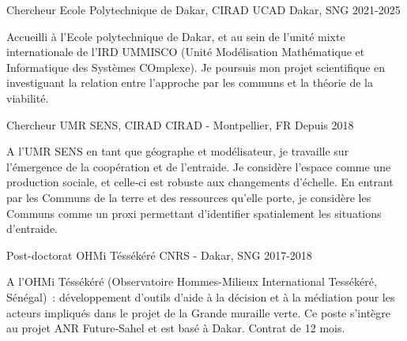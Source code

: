 

\begin{cventries}

\cventry
  {Chercheur} %
  {Ecole Polytechnique de Dakar, CIRAD} %
  {UCAD Dakar, SNG} %
  {2021-2025} %
  {
    \begin{cvitems} %
      Accueilli à l'Ecole polytechnique de Dakar, et au sein de l'unité mixte internationale de l'IRD UMMISCO (Unité Modélisation Mathématique et Informatique des Systèmes COmplexe). Je poursuis mon projet scientifique en investiguant la relation entre l'approche par les communs et la théorie de la viabilité.
    \end{cvitems}
  }


  \cventry
    {Chercheur} %
    {UMR SENS, CIRAD} %
    {CIRAD - Montpellier, FR} %
    {Depuis 2018} %
    {
      \begin{cvitems} %
        A l'UMR SENS en tant que géographe et modélisateur, je travaille sur l’émergence de la coopération et de l’entraide. Je considère l’espace comme une production sociale, et celle‑ci est robuste aux changements d’échelle. En entrant par les Communs de la terre et des ressources qu’elle porte, je considère les Communs comme un proxi permettant d’identifier spatialement les situations d’entraide.
      \end{cvitems}
    }


\cventry
  {Post-doctorat} %
  {OHMi Téssékéré} %
  {CNRS - Dakar, SNG} %
  {2017-2018} %
  {
    \begin{cvitems} %
      A l’OHMi Téssékéré (Observatoire Hommes-Milieux International Tessékéré, Sénégal) : développement d’outils d’aide à la décision et à la médiation pour les acteurs impliqués dans le projet de la Grande muraille verte. Ce poste s’intègre au projet ANR Future‑Sahel et est basé à Dakar. Contrat de 12 mois.
    \end{cvitems}
  }


\end{cventries}

